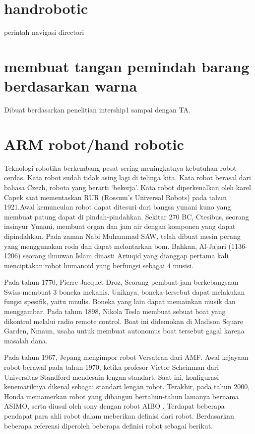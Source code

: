 \section{handrobotic}
perintah navigasi directori

\section{membuat tangan pemindah barang berdasarkan warna}
Dibuat berdasarkan penelitian intership1 sampai dengan TA.

\section {ARM robot/hand robotic}
Teknologi robotika berkembang pesat sering meningkatnya kebutuhan robot cerdas. Kata robot sudah tidak asing lagi di telinga kita. Kata robot berasal dari bahasa Czezh, robota yang berarti ‘bekerja’. Kata robot diperkenalkan oleh karel Capek saat mementaskan RUR (Rossum’s Universal Robots) pada tahun 1921.Awal kemunculan robot dapat ditesuri dari bangsa yunani kuno yang membuat patung dapat di pindah-pindahkan. Sekitar 270 BC, Ctesibus, seorang insinyur Yunani, membuat organ dan jam air dengan komponen yang dapat dipindahkan. Pada zaman Nabi Muhammad SAW, telah dibuat mesin perang yang menggunakan roda dan dapat melontarkan bom. Bahkan, Al-Jajari (1136-1206) seorang ilmuwan Islam dinasti Artuqid yang dianggap pertama kali menciptakan robot humanoid yang berfungsi sebagai 4 musisi.

Pada tahun 1770, Pierre Jacquet Droz, Seorang pembuat jam berkebangsaan Swiss membuat 3 boneka mekanis. Uniknya, boneka tersebut dapat melakukan fungsi spesifik, yaitu mnulis. Boneka yang lain dapat memainkan musik dan menggambar. Pada tahun 1898, Nikola Tesla membuat sebuat boat yang dikontrol melalui radio remote control. Boat ini didemokan di Madison Square Garden, Nmaun, usaha untuk membuat autonomus boat tersebut gagal karena masalah dana.

	Pada tahun 1967, Jepang mengimpor robot Versatran dari AMF. Awal kejayaan robot berawal pada tahun 1970, ketika profesor Victor Scheinman dari Universitas Standford mendesain lengan standart. Saat ini, konfigurasi kenematiknya dikenal sebagai standart lengan robot. Terakhir, pada tahun 2000, Honda memamerkan robot yang dibangun bertahun-tahun lamanya bernama ASIMO, serta diusul oleh sony dengan robot AIBO \cite{wasil2016kontrol}. Terdapat beberapa pendapat para ahli robot dalam meberikan definisi    dari robot. Berdasarkan beberapa referensi diperoleh beberapa definisi robot sebagai berikut.


